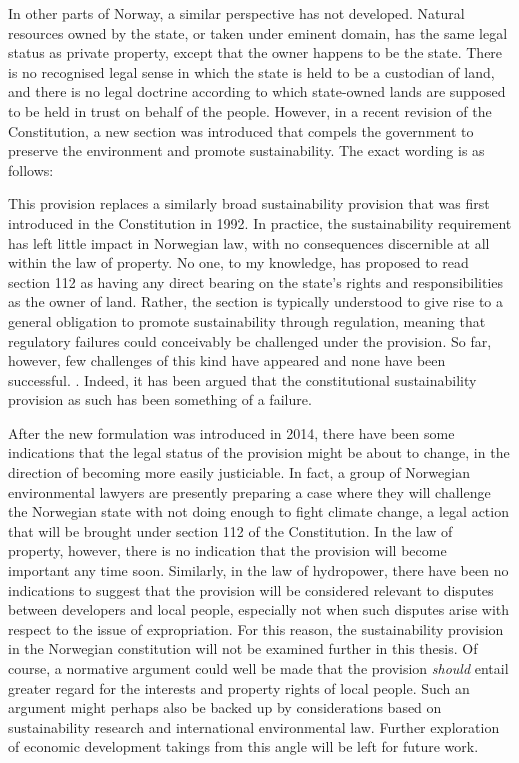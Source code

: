 In other parts of Norway, a similar perspective has not developed. Natural resources owned by the state, or taken under eminent domain, has the same legal status as private property, except that the owner happens to be the state. There is no recognised legal sense in which the state is held to be a custodian of land, and there is no legal doctrine according to which state-owned lands are supposed to be held in trust on behalf of the people. However, in a recent revision of the Constitution, a new section was introduced that compels the government to preserve the environment and promote sustainability. The exact wording is as follows:


This provision replaces a similarly broad sustainability provision that was first introduced in the Constitution in 1992. In practice, the sustainability requirement has left little impact in Norwegian law, with no consequences discernible at all within the law of property. No one, to my knowledge, has proposed to read section 112 as having any direct bearing on the state's rights and responsibilities as the owner of land. Rather, the section is typically understood to give rise to a general obligation to promote sustainability through regulation, meaning that regulatory failures could conceivably be challenged under the provision. So far, however, few challenges of this kind have appeared and none have been successful. . Indeed, it has been argued that the constitutional sustainability provision as such has been something of a failure.

After the new formulation was introduced in 2014, there have been some indications that the legal status of the provision might be about to change, in the direction of becoming more easily justiciable. In fact, a group of Norwegian environmental lawyers are presently preparing a case where they will challenge the Norwegian state with not doing enough to fight climate change, a legal action that will be brought under section 112 of the Constitution. In the law of property, however, there is no indication that the provision will become important any time soon. Similarly, in the law of hydropower, there have been no indications to suggest that the provision will be considered relevant to disputes between developers and local people, especially not when such disputes arise with respect to the issue of expropriation. For this reason, the sustainability provision in the Norwegian constitution will not be examined further in this thesis. Of course, a normative argument could well be made that the provision {\it should} entail greater regard for the interests and property rights of local people. Such an argument might perhaps also be backed up by considerations based on sustainability research and international environmental law. Further exploration of economic development takings from this angle will be left for future work.

